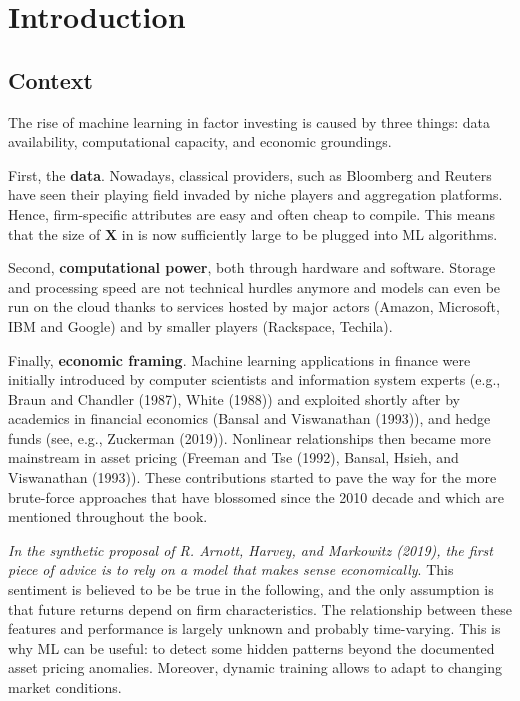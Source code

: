 \section{Introduction}

\subsection{Context}
The rise of machine learning in factor investing is caused by three things: data availability, computational capacity, and economic groundings.

First, the \textbf{data}. Nowadays, classical providers, such as Bloomberg and Reuters have seen their playing field invaded by niche players and aggregation platforms. Hence, firm-specific attributes are easy and often cheap to compile. This means that the size of $\mathbf{X}$ in is now sufficiently large to be plugged into ML algorithms.

Second, \textbf{computational power}, both through hardware and software. Storage and processing speed are not technical hurdles anymore and models can even be run on the cloud thanks to services hosted by major actors (Amazon, Microsoft, IBM and Google) and by smaller players (Rackspace, Techila).

Finally, \textbf{economic framing}. Machine learning applications in finance were initially introduced by computer scientists and information system experts (e.g., Braun and Chandler (1987), White (1988)) and exploited shortly after by academics in financial economics (Bansal and Viswanathan (1993)), and hedge funds (see, e.g., Zuckerman (2019)). Nonlinear relationships then became more mainstream in asset pricing (Freeman and Tse (1992), Bansal, Hsieh, and Viswanathan (1993)). These contributions started to pave the way for the more brute-force approaches that have blossomed since the 2010 decade and which are mentioned throughout the book.

\textit{In the synthetic proposal of R. Arnott, Harvey, and Markowitz (2019), the first piece of advice is to rely on a model that makes sense economically}. This sentiment is believed to be be true in the following, and the only assumption is that future returns depend on firm characteristics. The relationship between these features and performance is largely unknown and probably time-varying. This is why ML can be useful: to detect some hidden patterns beyond the documented asset pricing anomalies. Moreover, dynamic training allows to adapt to changing market conditions.

